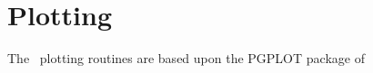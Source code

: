 \chapter{Plotting}
\label{c:plot}

The \bmad\ plotting routines are based upon the PGPLOT package of 






